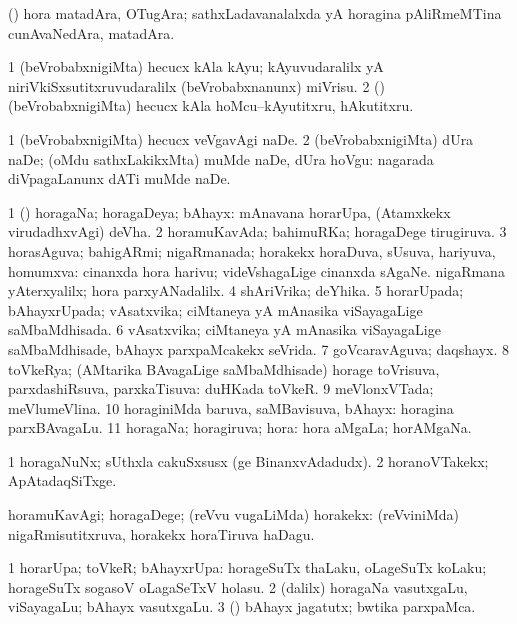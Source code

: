 \bentry
{}
\gl{\nA}
\bmng
(\birx) hora matadAra, OTugAra; sathxLadavanalalxda yA horagina pAliRmeMTina cunAvaNedAra, matadAra. 
\emng
\eentry

\bentry
{}
\gl{\sakirx}
\bmng
\bnum
\num{1} (beVrobabxnigiMta) hecucx kAla kAyu; kAyuvudaralilx yA niriVkiSxsutitxruvudaralilx (beVrobabxnanunx) miVrisu. 
\num{2} (\pArxparx) (beVrobabxnigiMta) hecucx kAla hoMcu--kAyutitxru, hAkutitxru. 
\enum
\emng
\eentry

\bentry
{}
\gl{\sakirx}
\bmng
\bnum
\num{1} (beVrobabxnigiMta) hecucx veVgavAgi naDe. 
\num{2} (beVrobabxnigiMta) dUra naDe; (oMdu sathxLakikxMta) muMde naDe, dUra hoVgu:  nagarada diVpagaLanunx dATi muMde naDe. 
\enum
\emng
\eentry

\bentry
{}
\gl{\gu}
\bmng
\bnum
\num{1} (\pArxparx) horagaNa; horagaDeya; bAhayx:  mAnavana horarUpa, (Atamxkekx virudadhxvAgi) deVha. 
\num{2} horamuKavAda; bahimuRKa; horagaDege tirugiruva. 
\num{3} horasAguva; bahigARmi; nigaRmanada; horakekx horaDuva, sUsuva, hariyuva, homumxva:  cinanxda hora harivu; videVshagaLige cinanxda sAgaNe.  nigaRmana yAterxyalilx; hora parxyANadalilx. 
\num{4} shAriVrika; deYhika. 
\num{5} horarUpada; bAhayxrUpada; vAsatxvika; ciMtaneya yA mAnasika viSayagaLige saMbaMdhisada. 
\num{6} vAsatxvika; ciMtaneya yA mAnasika viSayagaLige saMbaMdhisade, bAhayx parxpaMcakekx seVrida. 
\num{7} goVcaravAguva; daqshayx. 
\num{8} toVkeRya; (AMtarika BAvagaLige saMbaMdhisade) horage toVrisuva, parxdashiRsuva, parxkaTisuva:  duHKada toVkeR. 
\num{9} meVlonxVTada; meVlumeVlina. 
\num{10} horaginiMda baruva, saMBavisuva, bAhayx:  horagina parxBAvagaLu. 
\num{11} horagaNa; horagiruva; hora:  hora aMgaLa; horAMgaNa. 
\enum
\emng

\noindent
\gl{\pagu}
\bmng
\bnum
\num{1}  horagaNuNx; sUthxla cakuSxsusx (ge BinanxvAdadudx). 
\num{2}  horanoVTakekx; ApAtadaqSiTxge. 
\enum
\emng
\eentry

\bentry
{}
\gl{\kirxvi}
\bmng
horamuKavAgi; horagaDege; (reVvu \mo vugaLiMda) horakekx:  (reVviniMda) nigaRmisutitxruva, horakekx horaTiruva haDagu. 
\emng
\eentry

\bentry
{}
\gl{\nA}
\bmng
\bnum
\num{1} horarUpa; toVkeR; bAhayxrUpa:  horageSuTx thaLaku, oLageSuTx koLaku; horageSuTx sogasoV oLagaSeTxV holasu. 
\num{2} (\bava dalilx) horagaNa vasutxgaLu, viSayagaLu; bAhayx vasutxgaLu. 
\num{3} (\pArxparx) bAhayx jagatutx; bwtika parxpaMca. 
\enum
\emng
\eentry

